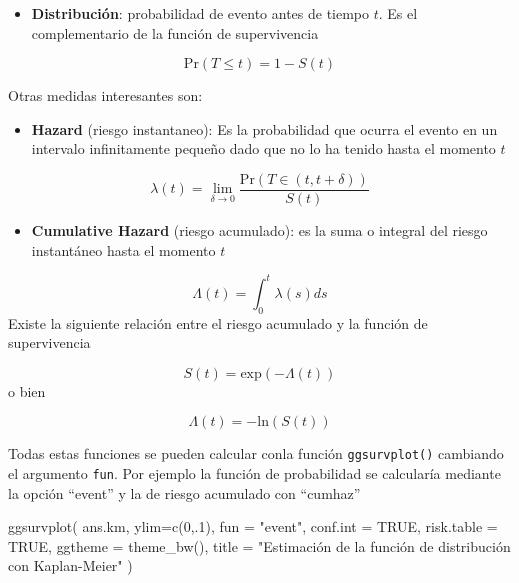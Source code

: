 \documentclass[
]{book}
\newenvironment{Shaded}{\begin{snugshade}}{\end{snugshade}}
\newcommand{\AttributeTok}[1]{\textcolor[rgb]{0.77,0.63,0.00}{#1}}
\newcommand{\ConstantTok}[1]{\textcolor[rgb]{0.00,0.00,0.00}{#1}}
\newcommand{\DecValTok}[1]{\textcolor[rgb]{0.00,0.00,0.81}{#1}}
\newcommand{\FunctionTok}[1]{\textcolor[rgb]{0.00,0.00,0.00}{#1}}
\newcommand{\NormalTok}[1]{#1}
\newcommand{\StringTok}[1]{\textcolor[rgb]{0.31,0.60,0.02}{#1}}
\providecommand{\tightlist}{%
  \setlength{\itemsep}{0pt}\setlength{\parskip}{0pt}}
\begin{document}
\begin{itemize}
\tightlist
\item
  \textbf{Distribución}: probabilidad de evento antes de tiempo \(t\). Es el complementario de la función de supervivencia
\end{itemize}

\[\text{Pr}(T\leq t) = 1-S(t)\]

Otras medidas interesantes son:

\begin{itemize}
\tightlist
\item
  \textbf{Hazard} (riesgo instantaneo): Es la probabilidad que ocurra el evento en un intervalo infinitamente pequeño dado que no lo ha tenido hasta el momento \(t\)
\end{itemize}

\[\lambda(t) = \lim_{\delta \rightarrow 0} \frac{\text{Pr}\left(T \in (t, t+\delta) \right)}{S(t)} \]

\begin{itemize}
\tightlist
\item
  \textbf{Cumulative Hazard} (riesgo acumulado): es la suma o integral del riesgo instantáneo hasta el momento \(t\)
\end{itemize}

\[\Lambda(t) = \int_{0}^{t} \lambda(s) ds\]
Existe la siguiente relación entre el riesgo acumulado y la función de supervivencia

\[S(t) = \text{exp} \left(-\Lambda(t)\right)\]
o bien

\[\Lambda(t) = -\text{ln}\left(S(t)\right)\]

Todas estas funciones se pueden calcular conla función \texttt{ggsurvplot()} cambiando el argumento \texttt{fun}. Por ejemplo la función de probabilidad se calcularía mediante la opción ``event'' y la de riesgo acumulado con ``cumhaz''

\begin{Shaded}
\begin{Highlighting}[]
\FunctionTok{ggsurvplot}\NormalTok{(}
\NormalTok{  ans.km, }\AttributeTok{ylim=}\FunctionTok{c}\NormalTok{(}\DecValTok{0}\NormalTok{,.}\DecValTok{1}\NormalTok{),}
  \AttributeTok{fun =} \StringTok{"event"}\NormalTok{,}
  \AttributeTok{conf.int =} \ConstantTok{TRUE}\NormalTok{,}
  \AttributeTok{risk.table =} \ConstantTok{TRUE}\NormalTok{,}
  \AttributeTok{ggtheme =} \FunctionTok{theme\_bw}\NormalTok{(),}
  \AttributeTok{title =} \StringTok{"Estimación de la función de distribución con Kaplan{-}Meier"}
\NormalTok{)}
\end{Highlighting}
\end{Shaded}
\end{document}
